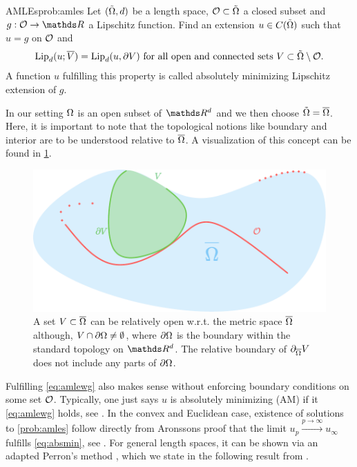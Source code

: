 %
\begin{problem}{AMLEs}{prob:amles}
Let $(\tilde{\Omega}, d)$ be a length space, $\mathcal{O}\subset\tilde{\Omega}$ a closed subset and $g:\conset\to\R$ a Lipschitz function. Find an extension $u\in C(\tilde{\Omega})$ such that $u=g$ on $\mathcal{O}$ and
%
\begin{align}\label{eq:amlewg}
\operatorname{Lip}_d(u; \overline{V}) = \operatorname{Lip}_d(u, \partial V) \text{ for all open and connected sets } V\subset \tilde{\Omega}\setminus \mathcal{O}.
\end{align}
%
A function $u$ fulfilling this property is called absolutely minimizing Lipschitz extension of $g$.
\end{problem}
%
\begin{remark}{}{}
In our setting $\Omega$ is an open subset of $\R^d$ and we then choose $\tilde{\Omega} = \overline{\Omega}$. Here, it is important to note that 
the topological notions like boundary and interior are to be understood relative to $\overline{\Omega}$. A visualization of this concept can be found in \cref{fig:relb}.
\end{remark}
%
\begin{figure}
\begin{center}
\includegraphics[width=.5\textwidth]{atelier/SSL/relboundary.pdf}
\end{center}
\caption{A set $V\subset\overline{\Omega}$ can be relatively open w.r.t. the metric space $\overline{\Omega}$ although, $V\cap\partial\Omega \neq\emptyset$, where $\partial \Omega$ is the boundary within the standard topology on $\R^d$. The relative boundary of $\partial_{\overline{\Omega}} V$ does not include any parts of $\partial \Omega$.}\label{fig:relb}
\end{figure}
%
%
\noindent%
Fulfilling \cref{eq:amlewg} also makes sense without enforcing boundary conditions on some set $\mathcal{O}$. Typically, one just says $u$ is absolutely minimizing (AM) if it \cref{eq:amlewg} holds, see \cite{aronsson2004tour}. In the convex and Euclidean case, existence of solutions to \cref{prob:amles} follow directly from Aronssons proof that the limit $u_p\xrightarrow{p\to\infty} u_\infty$ fulfills \cref{eq:absmin}, see \cite{aronsson1967extension}. For general length spaces, it can be shown via an adapted Perron's method \cite{perron1923neue}, which we state in the following result from \cite{juutinen2002absolutely}.

